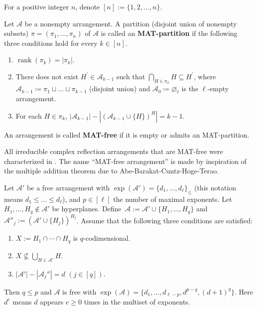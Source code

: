 \documentclass[ALCO, Unicode,published]{cedram}
\DeclareMathOperator{\rank}{rank}
\newcommand{\A}{\mathcal{A}}
\begin{document}
For a positive integer $n$, denote $[n]:=\{1,2,\ldots,n\}$. 
\begin{definition}
\label{def:MAT-partition-free}
Let $\A$ be a nonempty arrangement. 
A partition (disjoint union of nonempty subsets) $\pi= (\pi_{1}, \dots, \pi_{n}) $ of $\A$ is called an \textbf{MAT-partition} if  the following three conditions hold for every $ k \in [n] $. 
\begin{enumerate}[label=(MP\arabic*)]
\item\label{definition MAT partition 1} $ \rank(\pi_{k}) = |\pi_{k}| $.
\item\label{definition MAT partition 2} There does not exist $ H^{\prime} \in \mathcal{A}_{k-1} $ such that $ \bigcap_{H \in \pi_{k}}H \subseteq H^{\prime} $, where $ \mathcal{A}_{k-1} \coloneqq \pi_{1} \sqcup \dots \sqcup \pi_{k-1} $ (disjoint union) and $ \A_{0} \coloneqq \varnothing_\ell $ is the $\ell$-empty arrangement. 
\item\label{definition MAT partition 3} For each $ H \in \pi_{k} $, $ |\mathcal{A}_{k-1}| - |(\mathcal{A}_{k-1} \cup \{H\})^{H}| = k-1 $. 
\end{enumerate}
An arrangement  is called \textbf{MAT-free} if it is empty or  admits an MAT-partition. 
\end{definition}

All irreducible complex reflection arrangements that are MAT-free were characterized in  \cite{CM20}.
The name ``MAT-free arrangement'' is made by inspiration of the multiple addition theorem due to Abe-Barakat-Cuntz-Hoge-Terao. 
\begin{theorem}
\label{thm:MAT}
Let $\A'$ be a free arrangement with  $\exp(\A') =\{d_1, \ldots, d_\ell\}_{\le}$ (this notation means $d_{1}\le \dots\le d_{\ell}$), and $p \in [\ell]$ the number of maximal exponents.
 Let $H_1,\ldots,H_q\notin \A'$ be hyperplanes. Define~$\A:=\A'\cup\{H_1,\ldots,H_q\}$ and $\A''_j:=(\A'\cup\{H_j\})^{H_j}$.
Assume that the following three conditions are satisfied:
\begin{enumerate}[label=(\arabic*)]
\item $X:=H_1 \cap \cdots \cap H_q$ is $q$-codimensional.
\item  $X \nsubseteq \bigcup_{H \in \A'}H$. 
\item $|\A'|- |\A_j''|=d$ $(j \in [q])$.
\end{enumerate}
Then $q \le p$ and $\A$ is free with $\exp(\A)=\{d_1, \ldots, d_{\ell-p}, d^{p-q},(d+1)^q\}$.
Here $d^e$ means $d$ appears $e\ge0$ times  in the multiset of exponents.
\end{theorem}
\end{document}
